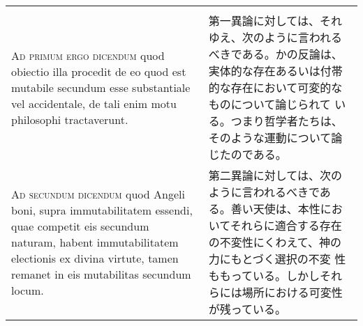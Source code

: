 \documentclass[10pt]{jsarticle} %
\begin{document}
\begin{longtable}{p{21em}p{21em}}
\\




\\



{\scshape Ad primum ergo dicendum} quod obiectio illa procedit de eo
quod est mutabile secundum esse substantiale vel accidentale, de tali
enim motu philosophi tractaverunt.

&

第一異論に対しては、それゆえ、次のように言われるべきである。かの反論は、
実体的な存在あるいは付帯的な存在において可変的なものについて論じられて
いる。つまり哲学者たちは、そのような運動について論じたのである。

\\

{\scshape Ad secundum dicendum} quod Angeli boni, supra
immutabilitatem essendi, quae competit eis secundum naturam, habent
immutabilitatem electionis ex divina virtute, tamen remanet in eis
mutabilitas secundum locum.

&


第二異論に対しては、次のように言われるべきである。善い天使は、本性にお
いてそれらに適合する存在の不変性にくわえて、神の力にもとづく選択の不変
性ももっている。しかしそれらには場所における可変性が残っている。


\end{longtable}
\end{document}
